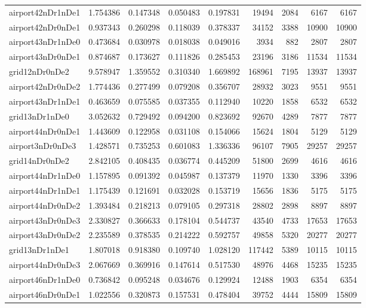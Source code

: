 \documentclass[../../../thesis.tex]{subfiles}
\begin{document}
\begin{longtable}{|l|r|r|r|r|r|r|r|r|}
airport42nDr1nDe1 & 1.754386 & 0.147348 & 0.050483 & 0.197831 & 19494 & 2084 & 6167 & 6167 \\
airport42nDr0nDe1 & 0.937343 & 0.260298 & 0.118039 & 0.378337 & 34152 & 3388 & 10900 & 10900 \\
airport43nDr1nDe0 & 0.473684 & 0.030978 & 0.018038 & 0.049016 & 3934 & 882 & 2807 & 2807 \\
airport43nDr0nDe1 & 0.874687 & 0.173627 & 0.111826 & 0.285453 & 23196 & 3186 & 11534 & 11534 \\
grid12nDr0nDe2 & 9.578947 & 1.359552 & 0.310340 & 1.669892 & 168961 & 7195 & 13937 & 13937 \\
airport42nDr0nDe2 & 1.774436 & 0.277499 & 0.079208 & 0.356707 & 28932 & 3023 & 9551 & 9551 \\
airport43nDr1nDe1 & 0.463659 & 0.075585 & 0.037355 & 0.112940 & 10220 & 1858 & 6532 & 6532 \\
grid13nDr1nDe0 & 3.052632 & 0.729492 & 0.094200 & 0.823692 & 92670 & 4289 & 7877 & 7877 \\
airport44nDr0nDe1 & 1.443609 & 0.122958 & 0.031108 & 0.154066 & 15624 & 1804 & 5129 & 5129 \\
airport3nDr0nDe3 & 1.428571 & 0.735253 & 0.601083 & 1.336336 & 96107 & 7905 & 29257 & 29257 \\
grid14nDr0nDe2 & 2.842105 & 0.408435 & 0.036774 & 0.445209 & 51800 & 2699 & 4616 & 4616 \\
airport44nDr1nDe0 & 1.157895 & 0.091392 & 0.045987 & 0.137379 & 11970 & 1330 & 3396 & 3396 \\
airport44nDr1nDe1 & 1.175439 & 0.121691 & 0.032028 & 0.153719 & 15656 & 1836 & 5175 & 5175 \\
airport44nDr0nDe2 & 1.393484 & 0.218213 & 0.079105 & 0.297318 & 28802 & 2898 & 8897 & 8897 \\
airport43nDr0nDe3 & 2.330827 & 0.366633 & 0.178104 & 0.544737 & 43540 & 4733 & 17653 & 17653 \\
airport43nDr0nDe2 & 2.235589 & 0.378535 & 0.214222 & 0.592757 & 49858 & 5320 & 20277 & 20277 \\
grid13nDr1nDe1 & 1.807018 & 0.918380 & 0.109740 & 1.028120 & 117442 & 5389 & 10115 & 10115 \\
airport44nDr0nDe3 & 2.067669 & 0.369916 & 0.147614 & 0.517530 & 48976 & 4468 & 15235 & 15235 \\
airport46nDr1nDe0 & 0.736842 & 0.095248 & 0.034676 & 0.129924 & 12488 & 1903 & 6354 & 6354 \\
airport46nDr0nDe1 & 1.022556 & 0.320873 & 0.157531 & 0.478404 & 39752 & 4444 & 15809 & 15809 \\

\end{longtable}
\end{document}
